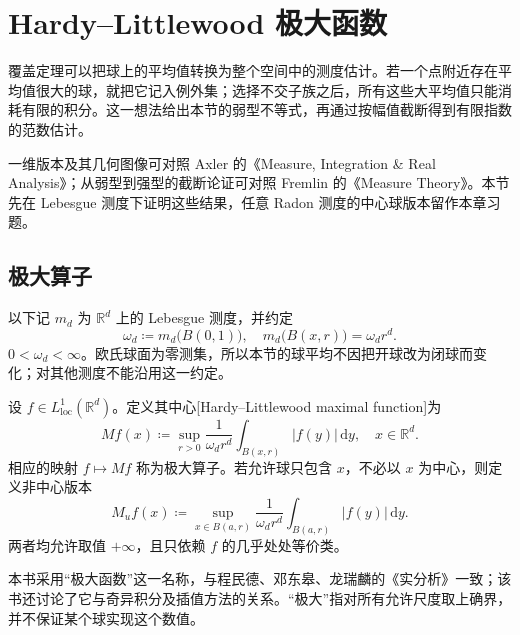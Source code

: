 \section{Hardy–Littlewood 极大函数}
\label{b1:sec:1303}

覆盖定理可以把球上的平均值转换为整个空间中的测度估计。若一个点附近存在平均值很大的球，就把它记入例外集；选择不交子族之后，所有这些大平均值只能消耗有限的积分。这一想法给出本节的弱型不等式，再通过按幅值截断得到有限指数的范数估计。

\ProseParagraphBreak

一维版本及其几何图像可对照 Axler 的《Measure, Integration \& Real Analysis》\cite[Section 4A]{Axler2020Measure}；从弱型到强型的截断论证可对照 Fremlin 的《Measure Theory》\cite[472E--F]{Fremlin2016Measure}。本节先在 Lebesgue 测度下证明这些结果，任意 Radon 测度的中心球版本留作本章习题。

\subsection{极大算子}
\label{b1:subsec:130301}

以下记 \(m_d\) 为 \(\mathbb R^d\) 上的 Lebesgue 测度，并约定
\[
 \omega_d\coloneqq m_d\bigl(B(0,1)\bigr),\quad
 m_d\bigl(B(x,r)\bigr)=\omega_dr^d.
\]
\(0<\omega_d<\infty\)。欧氏球面为零测集，所以本节的球平均不因把开球改为闭球而变化；对其他测度不能沿用这一约定。

\begin{definition}\label{b1:def:hl-maximal-operator}
设 \(f\in L^1_{\mathrm{loc}}(\mathbb R^d)\)。定义其中心[Hardy--Littlewood maximal function]为
\[
 Mf(x)\coloneqq\sup_{r>0}\frac1{\omega_dr^d}
                  \int_{B(x,r)}|f(y)|\,\mathrm dy,
 \quad x\in\mathbb R^d.
\]
相应的映射 \(f\mapsto Mf\) 称为极大算子。若允许球只包含 \(x\)，不必以 \(x\) 为中心，则定义非中心版本
\[
 M_uf(x)\coloneqq\sup_{x\in B(a,r)}\frac1{\omega_dr^d}
                  \int_{B(a,r)}|f(y)|\,\mathrm dy.
\]
两者均允许取值 \(+\infty\)，且只依赖 \(f\) 的几乎处处等价类。
\end{definition}

本书采用“极大函数”这一名称，与程民德、邓东皋、龙瑞麟的《实分析》\cite[第三章, 第4节]{Cheng2008RealAnalysis}一致；该书还讨论了它与奇异积分及插值方法的关系。“极大”指对所有允许尺度取上确界，并不保证某个球实现这个数值。

